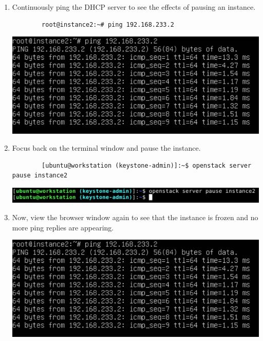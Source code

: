 \documentclass[letterpaper, 12pt]{article}
\begin{document}
\begin{enumerate}
    \item Continuously ping the DHCP server to see the effects of pausing an instance.
    \begin{lstlisting}
        root@instance2:~# ping 192.168.233.2
    \end{lstlisting}

    \begin{center}
        \includegraphics[width=\linewidth]{images/part4/step4.png}
    \end{center}

    \item Focus back on the terminal window and pause the instance.
    \begin{lstlisting}
        [ubuntu@workstation (keystone-admin)]:~$ openstack server pause instance2
    \end{lstlisting}

    \begin{center}
        \includegraphics[width=\linewidth]{images/part4/step5.png}
    \end{center}

    \item Now, view the browser window again to see that the instance is frozen and no more ping replies are appearing.

    \begin{center}
        \includegraphics[width=\linewidth]{images/part4/step6.png}
    \end{center}


\end{enumerate}
\end{document}
